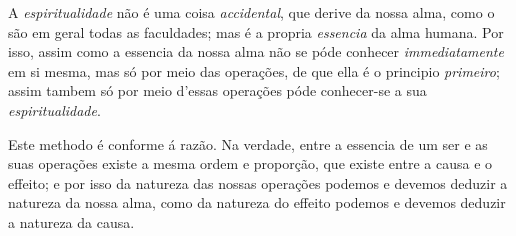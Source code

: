 
A \emph{espiritualidade} não é uma coisa \emph{accidental}, que derive da nossa alma, como o são em geral todas as faculdades; mas é a propria \emph{essencia} da alma humana. Por isso, assim como a essencia da nossa alma não se póde conhecer \emph{immediatamente} em si mesma, mas só por meio das operações, de que ella é o principio \emph{primeiro}; assim tambem só por meio d'essas operações póde conhecer-se a sua \emph{espiritualidade}.

Este methodo é conforme á razão. Na verdade, entre a essencia de um ser e as suas operações existe a mesma ordem e proporção, que existe entre a causa e o effeito; e por isso da natureza das nossas operações podemos e devemos deduzir a natureza da nossa alma, como da natureza do effeito podemos e devemos deduzir a natureza da causa.


